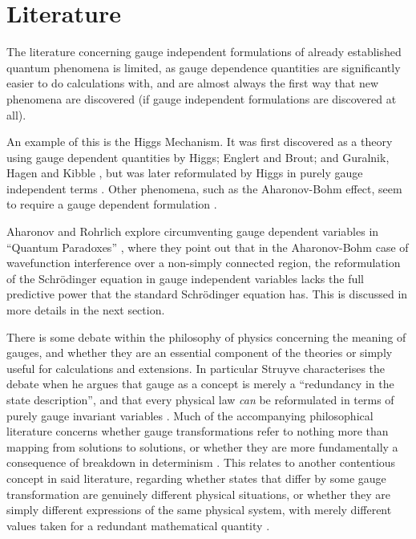 \section{Literature}
\label{sec:literature}

The literature concerning gauge independent formulations of already established
quantum phenomena is limited, as gauge dependence quantities are significantly
easier to do calculations with, and are almost always the first way that new
phenomena are discovered (if gauge independent formulations are discovered at
all).

An example of this is the Higgs Mechanism. It was first discovered as a theory
using gauge dependent quantities by Higgs; Englert and Brout; and Guralnik,
Hagen and Kibble \cite{higgs-1964,englert-brout,guralnik-hagen-kibble}, but was
later reformulated by Higgs in purely gauge independent terms \cite{higgs-1966}.
Other phenomena, such as the Aharonov-Bohm effect, seem to require a gauge
dependent formulation \cite{aharonov-bohm}.

Aharonov and Rohrlich explore circumventing gauge dependent variables in
``Quantum Paradoxes'' \cite{aharonov-rohrlich}, where they point out that in the
Aharonov-Bohm case of wavefunction interference over a non-simply connected
region, the reformulation of the Schr\"odinger equation in gauge independent
variables lacks the full predictive power that the standard Schr\"odinger
equation has. This is discussed in more details in the next section.

There is some debate within the philosophy of physics concerning the meaning of
gauges, and whether they are an essential component of the theories or simply
useful for calculations and extensions. In particular Struyve characterises the
debate when he argues that gauge as a concept is merely a ``redundancy in the
state description'', and that every physical law \textit{can} be reformulated in
terms of purely gauge invariant variables \cite{struyve}. Much of the
accompanying philosophical literature concerns whether gauge transformations
refer to nothing more than mapping from solutions to solutions, or whether they
are more fundamentally a consequence of breakdown in determinism
\cite{struyve,earman}. This relates to another contentious concept in said
literature, regarding whether states that differ by some gauge transformation
are genuinely different physical situations, or whether they are simply
different expressions of the same physical system, with merely different values
taken for a redundant mathematical quantity \cite{belot}.

